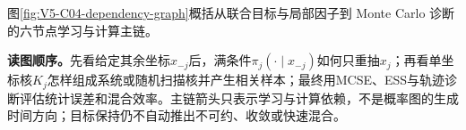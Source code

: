 \documentclass[UTF8,a4paper,11pt,openany]{ctexbook}
\begin{document}
\setcounter{page}{662}
\setcounter{chapter}{33}
\setcounter{figure}{0}
\pagestyle{headings}
\noindent 图\ref{fig:V5-C04-dependency-graph}概括从联合目标与局部因子到 Monte Carlo 诊断的六节点学习与计算主链。

\FloatBarrier
\noindent\textbf{读图顺序。}先看给定其余坐标$x_{-j}$后，满条件$\pi_j(\cdot\mid x_{-j})$如何只重抽$x_j$；再看单坐标核$K_j$怎样组成系统或随机扫描核并产生相关样本；最终用MCSE、ESS与轨迹诊断评估统计误差和混合效率。主链箭头只表示学习与计算依赖，不是概率图的生成时间方向；目标保持仍不自动推出不可约、收敛或快速混合。\par
\end{document}
